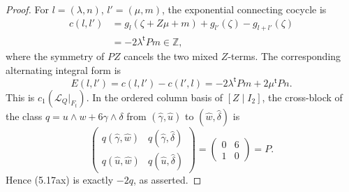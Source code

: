 \begin{proof}
For \(l=(\lambda,n)\), \(l'=(\mu,m)\), the exponential connecting
cocycle is
\begin{align*}
 c(l,l')
 &=g_l(\zeta+Z\mu+m)+g_{l'}(\zeta)-g_{l+l'}(\zeta)\\
 &=-2\lambda^{\mathsf t}Pm\in\mathbb Z,
\tag{5.17aw}
\end{align*}
where the symmetry of \(PZ\) cancels the two mixed \(Z\)-terms.
The corresponding alternating integral form is
\[
 E(l,l')=c(l,l')-c(l',l)
 =-2\lambda^{\mathsf t}Pm+2\mu^{\mathsf t}Pn.
\tag{5.17ax}
\]
This is \(c_1(\mathcal L_Q|_{F_t})\).  In the ordered column basis of
\([Z\mid I_2]\), the cross-block of the class
\(q=u\wedge w+6\gamma\wedge\delta\) from
\((\widehat\gamma,\widehat u)\) to
\((\widehat w,\widehat\delta)\) is
\[
 \begin{pmatrix}
 q(\widehat\gamma,\widehat w)&
 q(\widehat\gamma,\widehat\delta)\\
 q(\widehat u,\widehat w)&
 q(\widehat u,\widehat\delta)
 \end{pmatrix}
 =\begin{pmatrix}0&6\\1&0\end{pmatrix}=P.
\tag{5.17ay}
\]
Hence (5.17ax) is exactly \(-2q\), as asserted.
\end{proof}

